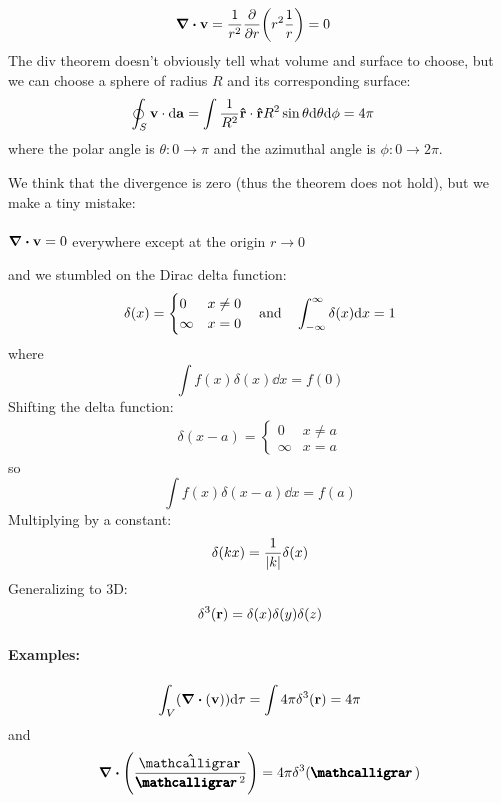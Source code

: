 \documentclass[../main.tex]{subfiles}
\begin{document}
\begin{align*}
    \div \vb v &= \frac{1}{r^2} \pdv{r}(r^2 \frac{1}{r}) = 0
\end{align*}
The div theorem doesn't obviously tell what volume and surface to choose,
but we can choose a sphere of radius $R$ and its corresponding surface:
\begin{align*}
    \oint_S \vb v \cdot \dd{\vb a} &= \int \frac{1}{R^2} \vu r \cdot \vu r R^2 \sin\theta \dd\theta \dd\phi = 4\pi
\end{align*}
where the polar angle is $\theta: 0 \to \pi$ and the azimuthal angle is $\phi: 0 \to 2\pi$.

We think that the divergence is zero (thus the theorem does not hold), but we make a tiny mistake:

\paragraph*{}
$\div \vb v = 0$ everywhere except at the origin $r \to 0$

and we stumbled on the Dirac delta function:
\begin{align*}
    \delta(x) = \begin{cases}
        0 & x \neq 0 \\
        \infty & x = 0
    \end{cases}
    \qand \int_{-\infty}^{\infty} \delta(x) \dd x = 1
\end{align*}
where
\[\int f(x)\delta(x) \dd x = f(0)\]
Shifting the delta function:
\begin{align*}
    \delta(x - a) = \begin{cases}
        0 & x \neq a \\
        \infty & x = a
    \end{cases}
\end{align*}
so
\[\int f(x) \delta(x - a) \dd x  = f(a)\]
Multiplying by a constant:
\[\delta(kx) = \frac{1}{\abs{k}} \delta(x)\]
Generalizing to 3D:
\[\delta^3(\vb r) = \delta(x) \delta(y) \delta (z)\]

\paragraph*{Examples:}
\[\int_V (\div (\vb v)) \dd\tau = \int 4\pi \delta^3(\vb r) = 4\pi\]
and
\[\div (\frac{\vu\scriptr}{\boldscriptr^2}) = 4\pi \delta^3(\boldscriptr)\]
\end{document}
